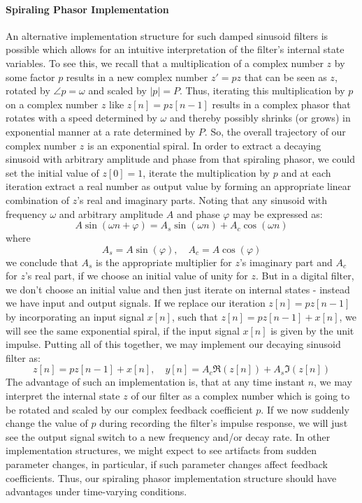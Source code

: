 \paragraph{Spiraling Phasor Implementation}
An alternative implementation structure for such damped sinusoid filters is possible which allows for an intuitive interpretation of the filter's internal state variables. To see this, we recall that a multiplication of a complex number $z$ by some factor $p$ results in a new complex number $z' = p z$ that can be seen as $z$, rotated by $\angle p = \omega$ and scaled by $|p| = P$. Thus, iterating this multiplication by $p$ on a complex number $z$ like $z[n] = p z[n-1]$ results in a complex phasor that rotates with a speed determined by $\omega$ and thereby possibly shrinks (or grows) in exponential manner at a rate determined by $P$. So, the overall trajectory of our complex number $z$ is an exponential spiral. In order to extract a decaying sinusoid with arbitrary amplitude and phase from that spiraling phasor, we could set the initial value of $z[0] = 1$, iterate the multiplication by $p$ and at each iteration extract a real number as output value by forming an appropriate linear combination of $z$'s real and imaginary parts. Noting that any sinusoid with frequency $\omega$ and arbitrary amplitude $A$ and phase $\varphi$ may be expressed as:
\begin{equation}
 A \sin(\omega n + \varphi) = A_s \sin(\omega n) + A_c \cos(\omega n)
\end{equation}
where
\begin{equation}
\boxed
{
 A_s = A \sin(\varphi), \quad A_c = A \cos(\varphi)
}
\end{equation}
we conclude that $A_s$ is the appropriate multiplier for $z$'s imaginary part and $A_c$ for $z$'s real part, if we choose an initial value of unity for $z$. But in a digital filter, we don't choose an initial value and then just iterate on internal states - instead we have input and output signals. If we replace our iteration $z[n] = p z[n-1]$ by incorporating an input signal $x[n]$, such that $z[n] = p z[n-1] + x[n]$, we will see the same exponential spiral, if the input signal $x[n]$ is given by the unit impulse. Putting all of this together, we may implement our decaying sinusoid filter as:
\begin{equation}
\boxed
{
 z[n] = p z[n-1] + x[n], \quad y[n] = A_c \Re(z[n]) + A_s \Im(z[n])
}
\end{equation}
The advantage of such an implementation is, that at any time instant $n$, we may interpret the internal state $z$ of our filter as a complex number which is going to be rotated and scaled by our complex feedback coefficient $p$. If we now suddenly change the value of $p$ during recording the filter's impulse response, we will just see the output signal switch to a new frequency and/or decay rate. In other implementation structures, we might expect to see artifacts from sudden parameter changes, in particular, if such parameter changes affect feedback coefficients. Thus, our spiraling phasor implementation structure should have advantages under time-varying conditions.

